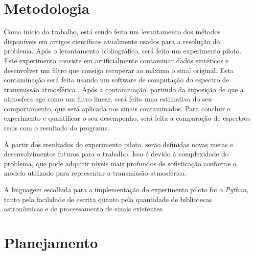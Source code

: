 \documentclass[11pt,twoside,a4paper]{article}
\begin{document}
\section{Metodologia}
\doublespacing
Como início do trabalho, está sendo feito um levantamento dos métodos disponíveis em artigos científicos atualmente usados para a resolução do problema. Após o levantamento bibliográfico, será feito um experimento piloto. Este experimento consiste em artificialmente contaminar dados sintéticos e desenvolver um filtro que consiga recuperar ao máximo o sinal original. Esta contaminação será feita usando um software de computação do espectro de transmissão atmosférica \cite{bertaux2014tapas}. Após a contaminação, partindo da suposição de que a atmosfera age como um filtro linear, será feita uma estimativa do seu comportamento, que será aplicada nos sinais contaminados. Para concluir o experimento e quantificar o seu desempenho, será feita a comparação de espectros reais com o resultado do programa.

À partir dos resultados do experimento piloto, serão definidas novas metas e desenvolvimentos futuros para o trabalho. Isso é devido à complexidade do problema, que pode adquirir níveis mais profundos de sofisticação conforme o modelo utilizado para representar a transmissão atmosférica.

A linguagem escolhida para a implementação do experimento piloto foi o \textit{Python}, tanto pela facilidade de escrita quanto pela quantidade de bibliotecas astronômicas e de processamento de sinais existentes.

\newpage
\section{Planejamento}
\doublespacing
\end{document}

